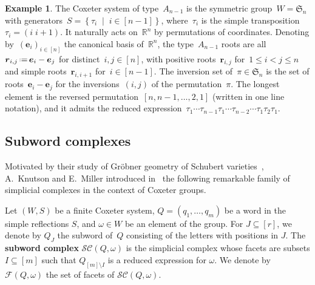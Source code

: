 \documentclass[reqno]{amsart}
\theoremstyle{definition}
\newtheorem{example}[theorem]{Example}
\newcommand{\R}{\mathbb{R}} %
\renewcommand{\b}[1]{\boldsymbol{#1}} %
\newcommand{\set}[2]{\left\{ #1 \;\middle|\; #2 \right\}} %
\newcommand{\eqdef}{\mbox{\,\raisebox{0.2ex}{\scriptsize\ensuremath{\mathrm:}}\ensuremath{=}\,}} %
\newcommand{\defn}[1]{\textbf{\textsf{\color{PineGreen} #1}}} %
\newcommand{\fS}{\mathfrak{S}} %
\newcommand{\subwordComplex}{\mathcal{SC}} %
\newcommand{\subwordFacets}{\mathcal{F}} %
\begin{document}
\begin{example}
\label{exm:typeACoxeterSystem}
The Coxeter system of type~$A_{n-1}$ is the symmetric group~$W = \fS_n$ with generators~$S = \set{\tau_i}{i \in [n-1]}$, where~$\tau_i$ is the simple transposition~$\tau_i = (i \; i+1)$.
It naturally acts on~$\R^n$ by permutations of coordinates.
Denoting by~$(\b{e}_i)_{i \in [n]}$ the canonical basis of~$\R^n$, the type~$A_{n-1}$ roots are all~$\b{r}_{i,j} \eqdef \b{e}_i - \b{e}_j$ for distinct~$i,j \in [n]$, with positive roots~$\b{r}_{i,j}$ for~$1 \le i < j \le n$ and simple roots~$\b{r}_{i,i+1}$ for~$i \in [n-1]$.
The inversion set of~$\pi \in \fS_n$ is the set of roots~$\b{e}_i - \b{e}_j$ for the inversions~$(i,j)$ of the permutation~$\pi$.
The longest element is the reversed permutation~$[n, n-1, \dots, 2, 1]$ (written in one line notation), and it admits the reduced expression~$\tau_1 \cdots \tau_{n-1} \tau_1 \cdots \tau_{n-2} \cdots \tau_1 \tau_2 \tau_1$.
\end{example}


\subsection{Subword complexes}
\label{subsec:subwordComplexes}

Motivated by their study of Gröbner geometry of Schubert varieties~\cite{KnutsonMiller-GroebnerGeometry}, A.~Knutson and E.~Miller introduced in~\cite{KnutsonMiller-subwordComplex} the following remarkable family of simplicial complexes in the context of Coxeter groups.

Let $(W,S)$ be a finite Coxeter system, $Q=(q_1,\dots,q_m)$ be a word in the simple reflections $S$, and $\omega \in W$ be an element of the group.
For $J\subseteq [r]$, we denote by $Q_J$ the subword of~$Q$ consisting of the letters with positions in $J$.
The \defn{subword complex} $\subwordComplex(Q,\omega)$ is the simplicial complex whose facets are subsets $I\subseteq [m]$ such that $Q_{[m]\setminus I}$ is a reduced expression for $\omega$.
We denote by $\subwordFacets(Q,\omega)$ the set of facets of $\subwordComplex(Q,\omega)$.
\end{document}
